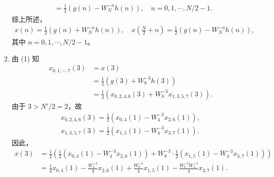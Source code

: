 \begin{solution}
\begin{enumerate}[label=(\arabic*)]
\begin{align*}
                & = \frac{1}{2}\left(g(n) - W_N^{-n}h(n)\right), \quad n = 0, 1, \cdots, N / 2 - 1.
            \end{align*}
            综上所述，
            \begin{align*}
                x(n) = \frac{1}{2}\left(g(n) + W_N^{-n}h(n)\right),
                    \quad x\left(\frac{N}{2} + n\right) = \frac{1}{2}\left(g(n) - W_N^{-n}h(n)\right),
            \end{align*}
            其中 $n = 0, 1, \cdots, N / 2 - 1$。
        \item 由 (1) 知
            \begin{align*}
                x_{0, 1, \cdots, 7}(3) & = x(3) \\
                & = \frac{1}{2}\left(g(3) + W_8^{-3}h(3)\right) \\
                & = \frac{1}{2}\left(x_{0, 2, 4, 6}(3) + W_8^{-3}x_{1, 3, 5, 7}(3)\right).
            \end{align*}
            由于 $3 > N' / 2 = 2$，故
            \begin{align*}
                x_{0, 2, 4, 6}(3) = \frac{1}{2}\left(x_{0, 4}(1) - W_{4}^{-3}x_{2, 6}(1)\right), \\
                x_{1, 3, 5, 7}(3) = \frac{1}{2}\left(x_{1, 5}(1) - W_{4}^{-3}x_{3, 7}(1)\right).
            \end{align*}
            因此，
            \begin{align*}
                x(3) & = \frac{1}{2}\left(\frac{1}{2}\left(x_{0, 4}(1) - W_{4}^{-3}x_{2, 6}(1)\right)
                    + W_8^{-3}\cdot \frac{1}{2}\left(x_{1, 5}(1) - W_{4}^{-3}x_{3, 7}(1)\right)\right) \\
                & = \frac{1}{4}x_{0, 4}(1) - \frac{W_{4}^{-3}}{4}x_{2, 6}(1) + \frac{W_8^{-3}}{4}x_{1, 5}(1) - \frac{W_8^{-3}W_{4}^{-3}}{4}x_{3, 7}(1).
            \end{align*}
    \end{enumerate}
\end{solution}

